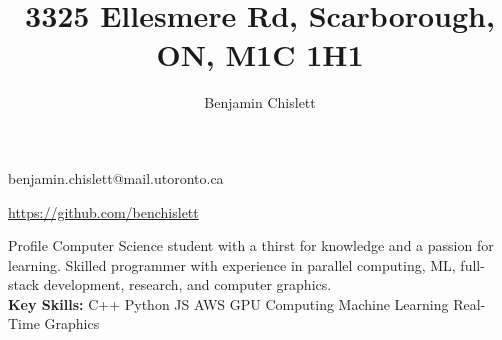 \documentclass[11pt, letterpaper]{article}
\title{3325 Ellesmere Rd, Scarborough, ON, M1C 1H1}
\author{Benjamin Chislett}
\date{}
\newcommand{\vbar}{\textbar\xspace}
\begin{document}
\begin{center}
  \Huge\theauthor
  \par
  \large{benjamin.chislett@mail.utoronto.ca}
  \par
  \large\url{https://github.com/benchislett}
\end{center}

\begin{section}{Profile}
Computer Science student with a thirst for knowledge and a passion for learning.
Skilled programmer with experience in parallel computing, ML, full-stack development, research, and computer graphics.
\\

\textbf{Key Skills:} C++ \vbar Python \vbar JS \vbar AWS \vbar GPU Computing \vbar Machine Learning \vbar Real-Time Graphics

\end{section}
\end{document}
